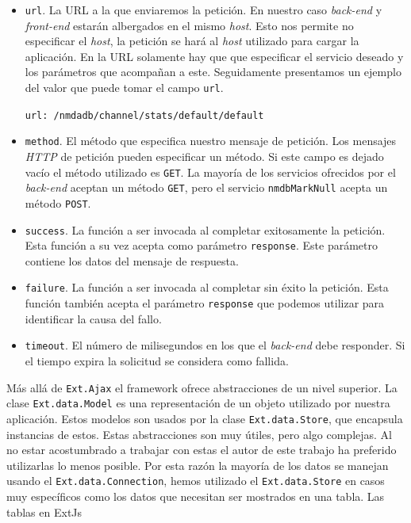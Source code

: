 	\begin{itemize}
		\item	\texttt{url}. La URL a la que enviaremos la petición. En nuestro caso \emph{back-end} y \emph{front-end} estarán albergados en
			el mismo \emph{host}. Esto nos permite no especificar el \emph{host}, la petición se hará al \emph{host} utilizado para cargar
			la aplicación. En la URL solamente hay que que especificar el servicio deseado y los parámetros que acompañan a este.
			Seguidamente presentamos un ejemplo del valor que puede tomar el campo \texttt{url}.
    				\begin{center} \texttt{url: \cc/nmdadb/channel/stats/default/default\cc}  \end{center}
		\item	\texttt{method}. El método que especifica nuestro mensaje de petición. Los mensajes \emph{HTTP} de petición pueden especificar
			un método. Si este campo es dejado vacío el método utilizado es \texttt{GET}. La mayoría de los servicios ofrecidos por el
			\emph{back-end} aceptan un método \texttt{GET}, pero el servicio \texttt{nmdbMarkNull} acepta un método \texttt{POST}.
		\item	\texttt{success}. La función a ser invocada al completar exitosamente la petición. Esta función a su vez acepta como parámetro
		  	\texttt{response}. Este parámetro contiene los datos del mensaje de respuesta.
		\item	\texttt{failure}. La función a ser invocada al completar sin éxito la petición. Esta función también acepta el parámetro
		  	\texttt{response} que podemos utilizar para identificar la causa del fallo.
		\item	\texttt{timeout}. El número de milisegundos en los que el \emph{back-end} debe responder. Si el tiempo expira la solicitud se
		  	considera como fallida. 
	\end{itemize}
	Más allá de \texttt{Ext.Ajax} el framework ofrece abstracciones de un nivel superior. La clase \texttt{Ext.data.Model} es una representación
	de un objeto utilizado por nuestra aplicación. Estos modelos son usados por la clase \texttt{Ext.data.Store}, que encapsula instancias de
	estos. Estas abstracciones son muy útiles, pero algo complejas. Al no estar acostumbrado a trabajar con estas el autor de este trabajo ha
	preferido utilizarlas lo menos posible. Por esta razón la mayoría de los datos se manejan usando el \texttt{Ext.data.Connection}, hemos
	utilizado el \texttt{Ext.data.Store} en casos muy específicos como los datos que necesitan ser mostrados en una tabla. Las tablas en ExtJs
